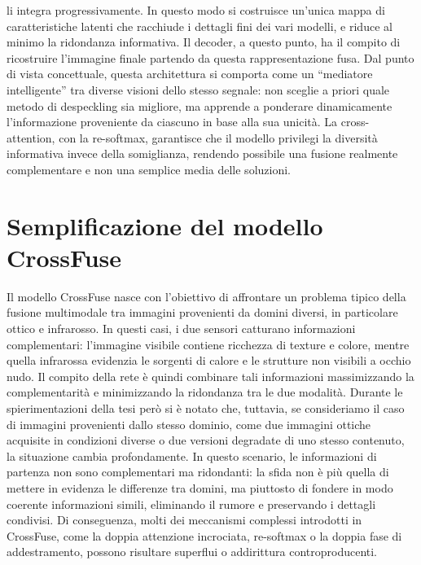li integra progressivamente. In questo modo si costruisce un’unica mappa di caratteristiche latenti che racchiude i dettagli fini dei vari modelli, 
e riduce al minimo la ridondanza informativa.
Il decoder, a questo punto, ha il compito di ricostruire l’immagine finale partendo da questa rappresentazione fusa. 
Dal punto di vista concettuale, questa architettura si comporta come un “mediatore intelligente” tra diverse visioni dello stesso segnale: non 
sceglie a priori quale metodo di despeckling sia migliore, ma apprende a ponderare dinamicamente l’informazione proveniente da ciascuno in base 
alla sua unicità. La cross-attention, con la re-softmax, garantisce che il modello privilegi la diversità informativa invece della somiglianza, 
rendendo possibile una fusione realmente complementare e non una semplice media delle soluzioni.

\section{Semplificazione del modello CrossFuse}
Il modello CrossFuse nasce con l’obiettivo di affrontare un problema tipico della fusione multimodale tra immagini provenienti da 
domini diversi, in particolare ottico e infrarosso. In questi casi, i due sensori catturano informazioni complementari: l’immagine 
visibile contiene ricchezza di texture e colore, mentre quella infrarossa evidenzia le sorgenti di calore e le strutture non 
visibili a occhio nudo. Il compito della rete è quindi combinare tali informazioni massimizzando la complementarità e 
minimizzando la ridondanza tra le due modalità. Durante le spierimentazioni della tesi però si è notato che,
tuttavia, se consideriamo il caso di immagini provenienti dallo stesso dominio, come due immagini ottiche acquisite in condizioni 
diverse o due versioni degradate di uno stesso contenuto, la situazione cambia profondamente.
In questo scenario, le informazioni di partenza non sono complementari ma ridondanti: la sfida non è più quella di mettere in evidenza 
le differenze tra domini, ma piuttosto di fondere in modo coerente informazioni simili, eliminando il rumore e preservando i dettagli condivisi.
Di conseguenza, molti dei meccanismi complessi introdotti in CrossFuse, come la doppia attenzione incrociata, re-softmax o la doppia fase di addestramento, 
possono risultare superflui o addirittura controproducenti.
